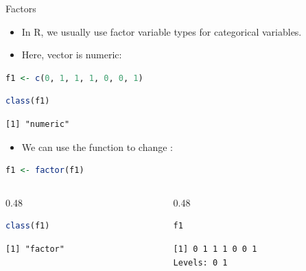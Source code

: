 \begin{frame}[fragile]{Factors}
\begin{itemize}
  \item In R, we usually use factor variable types for categorical variables.
  \item Here, vector  is numeric:
\end{itemize}
\begin{lstlisting}[language=R]
f1 <- c(0, 1, 1, 1, 0, 0, 1)
\end{lstlisting}
\begin{lstlisting}[language=R]
class(f1)
\end{lstlisting}
\begin{lstlisting}[style=output]
[1] "numeric"
\end{lstlisting}
\begin{itemize}
  \item We can use the  function to change :
\end{itemize}
\begin{lstlisting}[language=R]
f1 <- factor(f1)
\end{lstlisting}
\begin{columns}[T]
\begin{column}{0.48\textwidth}
\begin{lstlisting}[language=R]
class(f1)
\end{lstlisting}
\begin{lstlisting}[style=output]
[1] "factor"
\end{lstlisting}
\end{column}
\begin{column}{0.48\textwidth}
\begin{lstlisting}[language=R]
f1
\end{lstlisting}
\begin{lstlisting}[style=output]
[1] 0 1 1 1 0 0 1
Levels: 0 1
\end{lstlisting}
\end{column}
\end{columns}
\end{frame}

